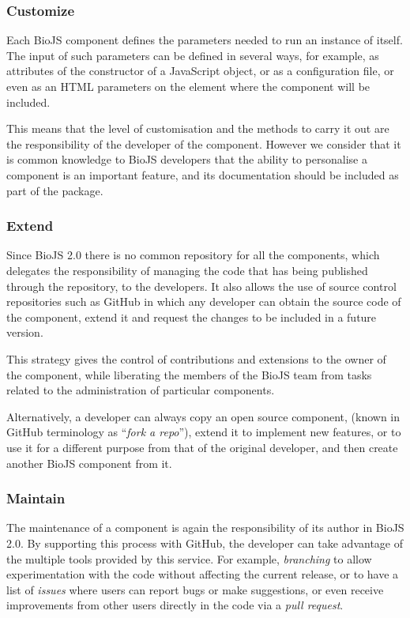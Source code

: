 \subsubsection{Customize}
Each BioJS component defines the parameters needed to run an instance of itself. The input of such parameters can be defined in several ways, for example, as attributes of the constructor of a JavaScript object, or as a configuration file, or even as an HTML parameters on the element where the component will be included.

This means that the level of customisation and the methods to carry it out are the responsibility of the developer of the component. However we consider that it is common knowledge to BioJS developers that the ability to personalise a component is an important feature, and its documentation should be included as part of the package.

\subsubsection{Extend}
Since BioJS 2.0 there is no common repository for all the components, which delegates the responsibility of managing the code that has being published through the repository, to the developers. It also allows the use of source control repositories such as GitHub in which any developer can obtain the source code of the component, extend it and request the changes to be included in a future version.

This strategy gives the control of contributions and extensions to the owner of the component, while liberating the members of the BioJS team from tasks related to the administration of particular components.

Alternatively, a developer can always copy an open source component, (known in GitHub terminology as ``\emph{fork a repo}''), extend it to implement new features, or to use it for a different purpose from that of the original developer, and then create another BioJS component from it.

\subsubsection{Maintain}
The maintenance of a component is again the responsibility of its author in BioJS 2.0. By supporting this process with GitHub, the developer can take advantage of the multiple tools provided by this service. For example, \emph{branching} to allow experimentation with the code without affecting the current release, or to have a list of \emph{issues} where users can report bugs or make suggestions, or even receive improvements from other users directly in the code via a \emph{pull request}.


